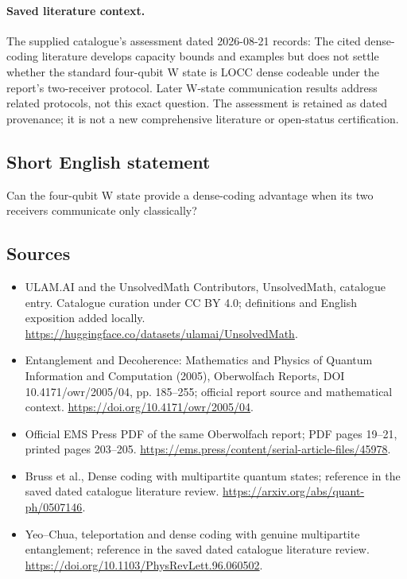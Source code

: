 \documentclass[11pt]{article}
\begin{document}
\paragraph{Saved literature context.} The supplied catalogue's assessment dated 2026-08-21 records: The cited dense-coding literature develops capacity bounds and examples but does not settle whether the standard four-qubit W state is LOCC dense codeable under the report's two-receiver protocol. Later W-state communication results address related protocols, not this exact question. The assessment is retained as dated provenance; it is not a new comprehensive literature or open-status certification.
\subsection{Short English statement}
Can the four-qubit W state provide a dense-coding advantage when its two receivers communicate only classically?
\subsection{Sources}
\begin{itemize}
\item[\hypertarget{source:statement:1}{S1}] ULAM.AI and the UnsolvedMath Contributors, UnsolvedMath, catalogue entry. Catalogue curation under CC BY 4.0; definitions and English exposition added locally.
\url{https://huggingface.co/datasets/ulamai/UnsolvedMath}.
\item[\hypertarget{source:statement:2}{S2}] Entanglement and Decoherence: Mathematics and Physics of Quantum Information and Computation (2005), Oberwolfach Reports, DOI 10.4171/owr/2005/04, pp. 185--255; official report source and mathematical context.
\url{https://doi.org/10.4171/owr/2005/04}.
\item[\hypertarget{source:statement:3}{S3}] Official EMS Press PDF of the same Oberwolfach report; PDF pages 19--21, printed pages 203--205.
\url{https://ems.press/content/serial-article-files/45978}.
\item[\hypertarget{source:statement:4}{S4}] Bruss et al., Dense coding with multipartite quantum states; reference in the saved dated catalogue literature review.
\url{https://arxiv.org/abs/quant-ph/0507146}.
\item[\hypertarget{source:statement:5}{S5}] Yeo--Chua, teleportation and dense coding with genuine multipartite entanglement; reference in the saved dated catalogue literature review.
\url{https://doi.org/10.1103/PhysRevLett.96.060502}.
\end{itemize}
\label{end:statement}
\end{document}
